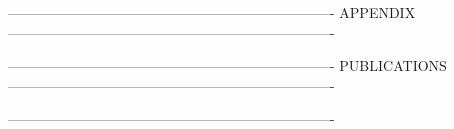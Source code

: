 \documentclass[a4paper, 12pt, twoside, openright,fleqn]{book}
\begin{document}
\clearpage{\pagestyle{empty}\cleardoublepage}	%
\fancyhead{}									%
\renewcommand{\headrulewidth}{0 pt}			    %
\fancyfoot[C]{--\thepage--}						%
\fontsize{11pt}{17 pt}\selectfont				%



\clearpage{\pagestyle{empty}\cleardoublepage}	%
\fancyhead{}									%
\renewcommand{\headrulewidth}{0 pt}			    %
\fancyfoot[C]{--\thepage--}						%
\fontsize{11pt}{17 pt}\selectfont				%







----------------------------------------------------------------------
                APPENDIX
----------------------------------------------------------------------
\clearpage{\pagestyle{empty}\cleardoublepage}	%
\fancyhead{}									%
\renewcommand{\headrulewidth}{0 pt}			%
\fancyfoot[C]{--\thepage--}					%
\fontsize{11pt}{17 pt}\selectfont				%




----------------------------------------------------------------------
                PUBLICATIONS
----------------------------------------------------------------------
\clearpage{\pagestyle{empty}\cleardoublepage}	%
\fancyhead{}							        %
\renewcommand{\headrulewidth}{0 pt}	        %
\fancyfoot[C]{--\thepage--}				    %
\fontsize{11pt}{17 pt}\selectfont			    %

----------------------------------------------------------------------
\end{document}
